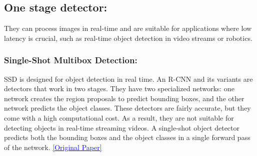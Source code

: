 \subsection{One stage detector: } 
They can process images in real-time and are suitable for applications where low latency is crucial, such as real-time object detection in video streams or robotics.

\subsubsection{Single-Shot Multibox Detection: }

SSD is designed for object detection in real time. An R-CNN and its variants are detectors that work in two stages. They have two specialized networks: one network creates the region proposals to predict bounding boxes, and the other network predicts the object classes. These detectors are fairly accurate, but they come with a high computational cost. As a result, they are not suitable for detecting objects in real-time streaming videos.
A single-shot object detector predicts both the bounding boxes and the object classes in a single forward pass of the network.\cite{liu2016ssd} \href{https://arxiv.org/pdf/1512.02325.pdf}{\textcolor{blue}{[Original Paper]}}
